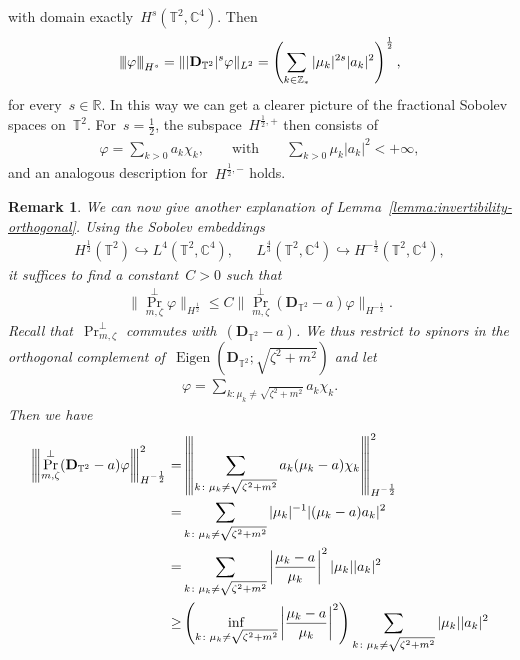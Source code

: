 \documentclass[11pt,final]{amsart}
\newcommand{\tnorm}[1]{%
  \left\vert\kern-0.3ex\left\vert\kern-0.3ex\left\vert #1 \right\vert\kern-0.3ex\right\vert\kern-0.3ex\right\vert
}
\newcommand{\R}{\mathbb{R}}
\newcommand{\C}{\mathbb{C}}
\newcommand{\T}{\mathbb{T}}
\newcommand{\pD}{\mathbf{D}}
\newcommand{\parenthesis}[1]{\left(#1\right)} %
\DeclareMathOperator{\Eigen}{Eigen}
\DeclareMathOperator{\proj}{Pr}
\newtheorem{rmk}[thm]{Remark}
\begin{document}
with domain exactly~$H^{s}(\T^2,\C^4)$. Then
\begin{align}
    \tnorm{\varphi}_{H^s}
    =
    \||\pD_{\T^2}|^s\varphi\|_{L^2}
    =
    \parenthesis{
        \sum_{k\in\mathbb Z_*}|\mu_k|^{2s}|a_k|^2
    }^{\frac12},
\end{align}
for every~$s\in\R$.
In this way we can get a clearer picture of the fractional Sobolev spaces on~$\T^2$.
For~$s=\frac{1}{2}$, the subspace~$H^{\frac{1}{2},+}$ then consists of 
\begin{align}
    \varphi=\sum_{k>0} a_k \chi_k, & & \mbox{ with } & & \sum_{k>0}\mu_k |a_k|^2<+\infty,
\end{align}
and an analogous description for~$H^{\frac{1}{2},-}$ holds. 

 

\begin{rmk}\label{rmk:resolvent-estimate}
    We can now give another explanation of Lemma~\ref{lemma:invertibility-orthogonal}. 
    Using the Sobolev embeddings
    \begin{align}
    H^{\frac{1}{2}}(\T^2)\hookrightarrow L^4(\T^2,\C^4), & & L^{\frac{4}{3}}(\T^2,\C^4)\hookrightarrow H^{-\frac{1}{2}}(\T^2,\C^4),
    \end{align}
    it suffices to find a constant~$C>0$ such that
    \begin{align}
    \|\proj_{m,\zeta}^\perp \varphi\|_{H^{\frac{1}{2}}}\leq C\|\proj_{m,\zeta}^\perp(\pD_{\T^2}-a)\varphi\|_{H^{-\frac{1}{2}}}.
    \end{align}
    Recall that~$\proj_{m,\zeta}^\perp$ commutes with~$(\pD_{\T^2}-a)$.
    We thus restrict to spinors in the orthogonal complement of~$\Eigen(\pD_{\T^2};\sqrt{\zeta^2+m^2})$ and let 
    \begin{align}
    \varphi=\sum_{k\colon \mu_k\neq\sqrt{\zeta^2+m^2}}a_k \chi_k.
    \end{align}
    Then we have 
    \begin{align}
        \tnorm{\proj_{m,\zeta}^\perp(\pD_{\T^2}-a)\varphi }_{H^{-\frac{1}{2}}}^2
        =&\tnorm{ \sum_{k\colon \mu_k\neq\sqrt{\zeta^2+m^2}} a_k(\mu_k-a) \chi_k }_{H^{-\frac{1}{2}}}^2 \\
        =&\sum_{k\colon \mu_k\neq\sqrt{\zeta^2+m^2}}|\mu_k|^{-1}|(\mu_k-a)a_k|^2 \\
        =&\sum_{k\colon\mu_k\neq\sqrt{\zeta^2+m^2}} \left|\frac{\mu_k-a}{\mu_k}\right|^2 |\mu_k| |a_k|^2 \\
        \geq& \parenthesis{ \inf_{k\colon \mu_k\neq\sqrt{\zeta^2+m^2}} \left|\frac{\mu_k-a}{\mu_k}\right|^2  } \sum_{k\colon\mu_k\neq \sqrt{\zeta^2+m^2}} |\mu_k| |a_k|^2\\

\end{align}
\end{rmk}
\end{document}
